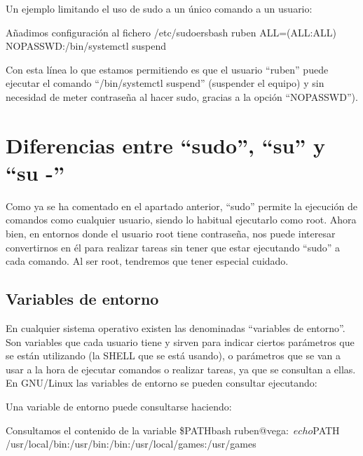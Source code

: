 Un ejemplo limitando el uso de sudo a un único comando a un usuario:

\begin{mycode}{Añadimos configuración al fichero \faFile \hspace{1pt} /etc/sudoers}{bash}{}
ruben    ALL=(ALL:ALL) NOPASSWD:/bin/systemctl suspend
\end{mycode}

Con esta línea lo que estamos permitiendo es que el usuario “ruben” puede ejecutar el comando “/bin/systemctl suspend” (suspender el equipo) y sin necesidad de meter contraseña al hacer sudo, gracias a la opción “NOPASSWD”).

\section{Diferencias entre “sudo”, “su” y “su -”}
Como ya se ha comentado en el apartado anterior, “sudo” permite la ejecución de comandos como cualquier usuario, siendo lo habitual ejecutarlo como root. Ahora bien, en entornos donde el usuario root tiene contraseña, nos puede interesar convertirnos en él para realizar tareas sin tener que estar ejecutando “sudo” a cada comando. Al ser root, tendremos que tener especial cuidado.

\subsection{Variables de entorno}
En cualquier sistema operativo existen las denominadas “variables de entorno”. Son variables que cada usuario tiene y sirven para indicar ciertos parámetros que se están utilizando (la SHELL que se está usando), o parámetros que se van a usar a la hora de ejecutar comandos o realizar tareas, ya que se consultan a ellas. En GNU/Linux las variables de entorno se pueden consultar ejecutando:


Una variable de entorno puede consultarse haciendo:

\begin{mycode}{Consultamos el contenido de la variable \$PATH}{bash}{}
ruben@vega:~$ echo $PATH
/usr/local/bin:/usr/bin:/bin:/usr/local/games:/usr/games

\end{mycode}

